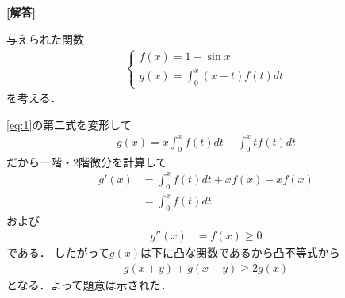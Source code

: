 \documentclass[../../main.tex]{subfiles}
\begin{document}
\begin{oframed}
  
\end{oframed}

{\bf [解答]}

与えられた関数
\begin{align}
  \begin{cases}
    f(x) = 1-\sin x \\
    g(x) = \int_{0}^{x}(x-t)f(t)dt
  \end{cases} \label{eq:1}
\end{align}
を考える．

\cref{eq:1}の第二式を変形して
\begin{align}
  g(x)=x\int_0^xf(t)dt-\int_0^xtf(t)dt
\end{align}
だから一階・2階微分を計算して
\begin{align}
  g'(x)
  &=\int_0^xf(t)dt+xf(x)-xf(x) \\
  &=\int_0^xf(t)dt
\end{align}
および
\begin{align}
  g''(x)&=f(x) \ge 0
\end{align}
である．
したがって$g(x)$は下に凸な関数であるから凸不等式から
\begin{align}
  g(x+y)+g(x-y)\ge 2g(x)
\end{align}
となる．よって題意は示された．
\newpage
\end{document}
